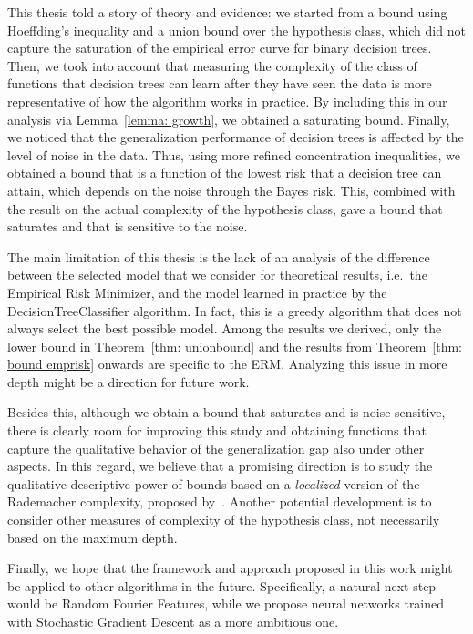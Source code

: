 This thesis told a story of theory and evidence: we started from a bound using Hoeffding's inequality and a union bound over the hypothesis class, which did not capture the saturation of the empirical error curve for binary decision trees. Then, we took into account that measuring the complexity of the class of functions that decision trees can learn after they have seen the data is more representative of how the algorithm works in practice. By including this in our analysis via Lemma~\ref{lemma: growth}, we obtained a saturating bound. Finally, we noticed that the generalization performance of decision trees is affected by the level of noise in the data. Thus, using more refined concentration inequalities, we obtained a bound that is a function of the lowest risk that a decision tree can attain, which depends on the noise through the Bayes risk. This, combined with the result on the actual complexity of the hypothesis class, gave a bound that saturates and that is sensitive to the noise. 

The main limitation of this thesis is the lack of an analysis of the difference between the selected model that we consider for theoretical results, i.e.\ the Empirical Risk Minimizer, and the model learned in practice by the DecisionTreeClassifier algorithm. In fact, this is a greedy algorithm that does not always select the best possible model. Among the results we derived, only the lower bound in Theorem~\ref{thm: unionbound} and the results from Theorem~\ref{thm: bound emprisk} onwards are specific to the ERM. Analyzing this issue in more depth might be a direction for future work. 

Besides this, although we obtain a bound that saturates and is noise-sensitive, there is clearly room for improving this study and obtaining functions that capture the qualitative behavior of the generalization gap also under other aspects. In this regard, we believe that a promising direction is to study the qualitative descriptive power of bounds based on a {\it localized\/} version of the Rademacher complexity, proposed by~\cite{Bartlett_2005}. Another potential development is to consider other measures of complexity of the hypothesis class, not necessarily based on the maximum depth. 

Finally, we hope that the framework and approach proposed in this work might be applied to other algorithms in the future. Specifically, a natural next step would be Random Fourier Features, while we propose neural networks trained with Stochastic Gradient Descent as a more ambitious one. 